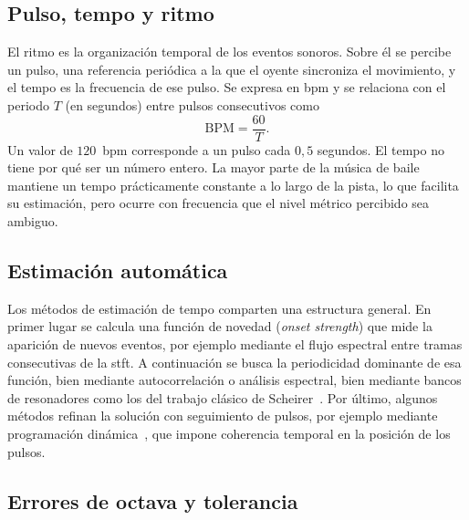 \subsection{Pulso, tempo y ritmo}

El ritmo es la organización temporal de los eventos sonoros. Sobre él se percibe un pulso, una referencia periódica a la que el oyente sincroniza el movimiento, y el tempo es la frecuencia de ese pulso. Se expresa en \acs{bpm} y se relaciona con el periodo $T$ (en segundos) entre pulsos consecutivos como
\begin{equation}
  \mathrm{BPM} = \frac{60}{T}.
  \label{eq:bpm}
\end{equation}
Un valor de $120$~\acs{bpm} corresponde a un pulso cada $0{,}5$ segundos. El tempo no tiene por qué ser un número entero. La mayor parte de la música de baile mantiene un tempo prácticamente constante a lo largo de la pista, lo que facilita su estimación, pero ocurre con frecuencia que el nivel métrico percibido sea ambiguo.

\subsection{Estimación automática}

Los métodos de estimación de tempo comparten una estructura general. En primer lugar se calcula una función de novedad (\emph{onset strength}) que mide la aparición de nuevos eventos, por ejemplo mediante el flujo espectral entre tramas consecutivas de la \acs{stft}. A continuación se busca la periodicidad dominante de esa función, bien mediante autocorrelación o análisis espectral, bien mediante bancos de resonadores como los del trabajo clásico de Scheirer~\cite{scheirer1998tempo}. Por último, algunos métodos refinan la solución con seguimiento de pulsos, por ejemplo mediante programación dinámica~\cite{ellis2007beat}, que impone coherencia temporal en la posición de los pulsos.

\subsection{Errores de octava y tolerancia}

